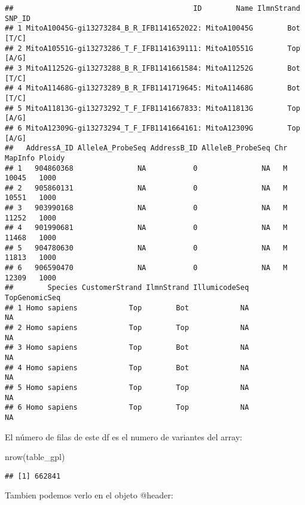 \documentclass[
]{article}
\newenvironment{Shaded}{\begin{snugshade}}{\end{snugshade}}
\newcommand{\FunctionTok}[1]{\textcolor[rgb]{0.00,0.00,0.00}{#1}}
\newcommand{\NormalTok}[1]{#1}
\newcommand{\SpecialCharTok}[1]{\textcolor[rgb]{0.00,0.00,0.00}{#1}}
\begin{document}
\begin{verbatim}
##                                          ID        Name IlmnStrand SNP_ID
## 1 MitoA10045G-gi13273284_B_R_IFB1141652022: MitoA10045G        Bot  [T/C]
## 2 MitoA10551G-gi13273286_T_F_IFB1141639111: MitoA10551G        Top  [A/G]
## 3 MitoA11252G-gi13273288_B_R_IFB1141661584: MitoA11252G        Bot  [T/C]
## 4 MitoA11468G-gi13273289_B_R_IFB1141719645: MitoA11468G        Bot  [T/C]
## 5 MitoA11813G-gi13273292_T_F_IFB1141667833: MitoA11813G        Top  [A/G]
## 6 MitoA12309G-gi13273294_T_F_IFB1141664161: MitoA12309G        Top  [A/G]
##   AddressA_ID AlleleA_ProbeSeq AddressB_ID AlleleB_ProbeSeq Chr MapInfo Ploidy
## 1   904860368               NA           0               NA   M   10045   1000
## 2   905860131               NA           0               NA   M   10551   1000
## 3   903990168               NA           0               NA   M   11252   1000
## 4   901990681               NA           0               NA   M   11468   1000
## 5   904780630               NA           0               NA   M   11813   1000
## 6   906590470               NA           0               NA   M   12309   1000
##        Species CustomerStrand IlmnStrand IllumicodeSeq TopGenomicSeq
## 1 Homo sapiens            Top        Bot            NA            NA
## 2 Homo sapiens            Top        Top            NA            NA
## 3 Homo sapiens            Top        Bot            NA            NA
## 4 Homo sapiens            Top        Bot            NA            NA
## 5 Homo sapiens            Top        Top            NA            NA
## 6 Homo sapiens            Top        Top            NA            NA
\end{verbatim}

El número de filas de este df es el numero de variantes del array:

\begin{Shaded}
\begin{Highlighting}[]
\FunctionTok{nrow}\NormalTok{(table\_gpl)}
\end{Highlighting}
\end{Shaded}

\begin{verbatim}
## [1] 662841
\end{verbatim}

Tambien podemos verlo en el objeto @header:

\begin{Shaded}
\end{Shaded}
\end{document}
